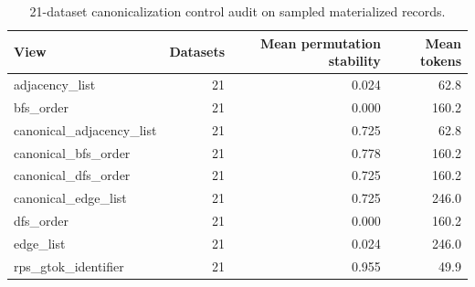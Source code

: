 \begin{table}[t]
\centering
\caption{21-dataset canonicalization control audit on sampled materialized records.}
\begin{tabular}{lrrr}
\toprule
View & Datasets & Mean permutation stability & Mean tokens \\
\midrule
adjacency_list & 21 & 0.024 & 62.8 \\
bfs_order & 21 & 0.000 & 160.2 \\
canonical_adjacency_list & 21 & 0.725 & 62.8 \\
canonical_bfs_order & 21 & 0.778 & 160.2 \\
canonical_dfs_order & 21 & 0.725 & 160.2 \\
canonical_edge_list & 21 & 0.725 & 246.0 \\
dfs_order & 21 & 0.000 & 160.2 \\
edge_list & 21 & 0.024 & 246.0 \\
rps_gtok_identifier & 21 & 0.955 & 49.9 \\
\bottomrule
\end{tabular}
\end{table}
